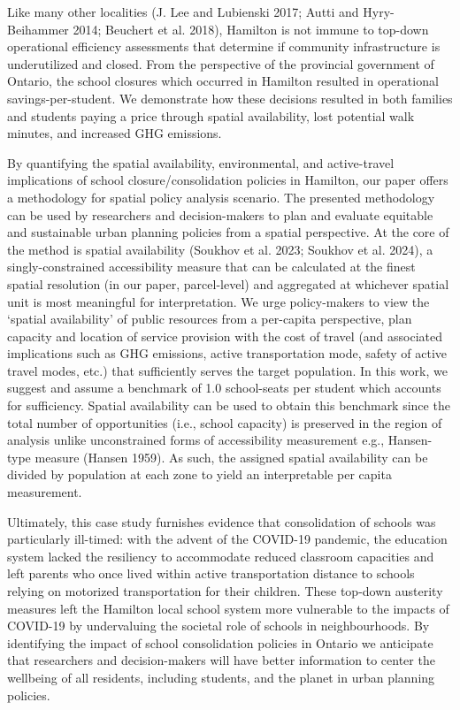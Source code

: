 \documentclass[
default
]{sn-jnl}
\begin{document}
Like many other localities (J. Lee and Lubienski 2017; Autti and
Hyry-Beihammer 2014; Beuchert et al. 2018), Hamilton is not immune to
top-down operational efficiency assessments that determine if community
infrastructure is underutilized and closed. From the perspective of the
provincial government of Ontario, the school closures which occurred in
Hamilton resulted in operational savings-per-student. We demonstrate how
these decisions resulted in both families and students paying a price
through spatial availability, lost potential walk minutes, and increased
GHG emissions.

By quantifying the spatial availability, environmental, and
active-travel implications of school closure/consolidation policies in
Hamilton, our paper offers a methodology for spatial policy analysis
scenario. The presented methodology can be used by researchers and
decision-makers to plan and evaluate equitable and sustainable urban
planning policies from a spatial perspective. At the core of the method
is spatial availability (Soukhov et al. 2023; Soukhov et al. 2024), a
singly-constrained accessibility measure that can be calculated at the
finest spatial resolution (in our paper, parcel-level) and aggregated at
whichever spatial unit is most meaningful for interpretation. We urge
policy-makers to view the `spatial availability' of public resources
from a per-capita perspective, plan capacity and location of service
provision with the cost of travel (and associated implications such as
GHG emissions, active transportation mode, safety of active travel
modes, etc.) that sufficiently serves the target population. In this
work, we suggest and assume a benchmark of 1.0 school-seats per student
which accounts for sufficiency. Spatial availability can be used to
obtain this benchmark since the total number of opportunities (i.e.,
school capacity) is preserved in the region of analysis unlike
unconstrained forms of accessibility measurement e.g., Hansen-type
measure (Hansen 1959). As such, the assigned spatial availability can be
divided by population at each zone to yield an interpretable per capita
measurement.

Ultimately, this case study furnishes evidence that consolidation of
schools was particularly ill-timed: with the advent of the COVID-19
pandemic, the education system lacked the resiliency to accommodate
reduced classroom capacities and left parents who once lived within
active transportation distance to schools relying on motorized
transportation for their children. These top-down austerity measures
left the Hamilton local school system more vulnerable to the impacts of
COVID-19 by undervaluing the societal role of schools in neighbourhoods.
By identifying the impact of school consolidation policies in Ontario we
anticipate that researchers and decision-makers will have better
information to center the wellbeing of all residents, including
students, and the planet in urban planning policies.
\end{document}
